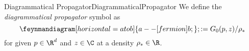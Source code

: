 \begin{mdef}{Diagrammatical Propagator}{DiagrammaticalPropagator}
    We define the \emph{diagrammatical propagator} symbol as 
    \[
        \feynmandiagram[horizontal=a to b]{a -- [fermion] b;}; := G_0(p,z)/\rho_*
    \]
    for given $p\in\R^d$ and $z\in\C$ at a density $\rho_*\in\R$.
\end{mdef}